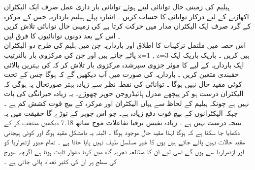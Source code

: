  
ہیلیم کی زمینی حال توانائی    لیتے ہوئے توانائی بار داری عمل صرف ایک الیکٹران اکھاڑنے کے لیے درکار توانائی کا حساب کریں ۔
اشارہ پہلے ہیلیم بارداریہ   جس کے مرکزہ کے گرد صرف ایک الیکٹران مدار میں حرکت کرتا ہے کی زمینی حال توانائی تلاش کریں ۔
اس کے بعد دونوں توانائیوں کا فرق لیں 
\\
اس حصہ میں ملتمل ترکیبات کا اطلاق    اور    بارداریہ جن میں ہلیم کی طرح دو الیکٹران پائے جاتے ہیں اور جن کی مرکزوی بار بالترتیب z=1 , z=3 ہیں کریں ۔
باریک باریک ایک ایک بارداریہ کے لیے کا موثر جزوی سپرشدہ مرکزوی بار تلاش کر کہ    کی بہترین بالائی حقبندی متعین کریں ۔
 بارداریہ    کی صورت میں آپ دیکھیں گے کہ     ہوگا جس کے تحت کوئی مقید حال نہیں ہوگا ۔
توانائی کی نقطہ نظر سے زیادہ بہتر صورتحال یہ ہوگی کہ الیکٹران درست ہو کر پیچھے مدرل ہائیڈروجن جوہر چھوڑے۔ یہ زیادہ حیرانگی کی بات نہیں ہے چونکہ ہیلیم کے لحاظ سے یہاں الیکٹران اور مرکزہ کے بیچ قوت کشش کم ہے ۔ جبکہ الیکٹرانوں کے بیچ قوت دفع زیادہ ہے۔
جو اس جوہر کے توڑے گا حقیقت میں یہ نتیجہ درست نہیں ہے ۔ زیادہ نفیس برقیا تفاعلات موج ساتھ 
7.18
دیکھیں 
منتخب کر کے دکھایا جا سکتا ہے کہ   ہوگا لہٰذا مقید حال موجود ہوگا ۔
البتہ یہ بامشکل مقید ہوگا اور کوئی ہیجانی مقید حالات نہیں پائے جاتے ہیں یوں   کا غیر مسلسل طیف نہیں پایا جاتا ہے ۔
تمام عبور ازتمراریا کو اور ازتمراریا سے ہوں گے اسی لیے ان کا مطالعہ تجربہ گاہ میں کرنا دشوار ثابت ہوتا ہے اگرچہ سورج کی سطح پر ان کی کثیر تعداد پائی جاتی ہے ۔

